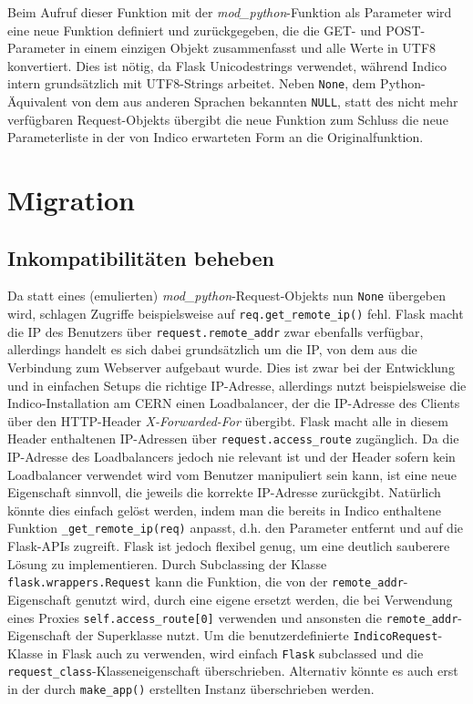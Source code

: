 Beim Aufruf dieser Funktion mit der \emph{mod\_python}-Funktion als Parameter wird eine neue
Funktion definiert und zurückgegeben, die die GET- und POST-Parameter in einem einzigen Objekt
zusammenfasst und alle Werte in UTF8 konvertiert. Dies ist nötig, da Flask Unicodestrings verwendet,
während Indico intern grundsätzlich mit UTF8-Strings arbeitet. Neben \lstinline{None}, dem
Python-Äquivalent von dem aus anderen Sprachen bekannten \lstinline{NULL}, statt des nicht mehr
verfügbaren Request-Objekts übergibt die neue Funktion zum Schluss die neue Parameterliste in der
von Indico erwarteten Form an die Originalfunktion.


\section{Migration}

\subsection{Inkompatibilitäten beheben}
Da statt eines (emulierten) \emph{mod\_python}-Request-Objekts nun \lstinline{None} übergeben wird,
schlagen Zugriffe beispielsweise auf \lstinline{req.get_remote_ip()} fehl. Flask macht die IP des
Benutzers über \lstinline{request.remote_addr} zwar ebenfalls verfügbar, allerdings handelt es sich
dabei grundsätzlich um die IP, von dem aus die Verbindung zum Webserver aufgebaut wurde. Dies ist
zwar bei der Entwicklung und in einfachen Setups die richtige IP-Adresse, allerdings nutzt
beispielsweise die Indico-Installation am CERN einen Loadbalancer, der die IP-Adresse des Clients
über den HTTP-Header \emph{X-Forwarded-For} übergibt. Flask macht alle in diesem Header enthaltenen
IP-Adressen über \lstinline{request.access_route} zugänglich. Da die IP-Adresse des Loadbalancers
jedoch nie relevant ist und der Header sofern kein Loadbalancer verwendet wird vom Benutzer
manipuliert sein kann, ist eine neue Eigenschaft sinnvoll, die jeweils die korrekte IP-Adresse
zurückgibt. Natürlich könnte dies einfach gelöst werden, indem man die bereits in Indico enthaltene
Funktion \lstinline{_get_remote_ip(req)} anpasst, d.h. den Parameter entfernt und auf die Flask-APIs
zugreift. Flask ist jedoch flexibel genug, um eine deutlich sauberere Lösung zu implementieren.
Durch Subclassing der Klasse \lstinline{flask.wrappers.Request} kann die Funktion, die von der
\lstinline{remote_addr}-Eigenschaft genutzt wird, durch eine eigene ersetzt werden, die bei
Verwendung eines Proxies \lstinline{self.access_route[0]} verwenden und ansonsten die
\lstinline{remote_addr}-Eigenschaft der Superklasse nutzt. Um die benutzerdefinierte
\lstinline{IndicoRequest}-Klasse in Flask auch zu verwenden, wird einfach \lstinline{Flask}
subclassed und die \lstinline{request_class}-Klasseneigenschaft überschrieben. Alternativ könnte es
auch erst in der durch \lstinline{make_app()} erstellten Instanz überschrieben werden.

